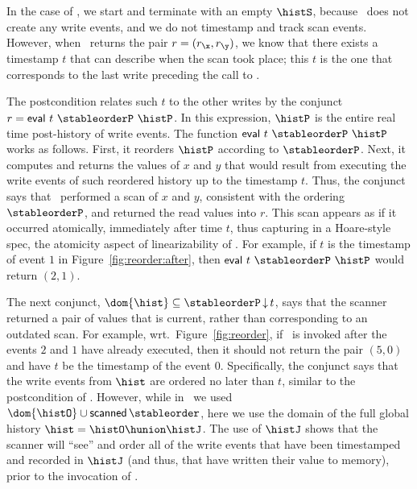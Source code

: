 
In the case of \jyscan, we start and terminate with an empty $\histS$,
because \jyscan\ does not create any write events, and we do not
timestamp and track scan events. However, when \jyscan\ returns the
pair $r = (r_\x, r_\y)$, we know that there exists a timestamp $t$
that can describe when the scan took place; this $t$ is the one that
corresponds to the last write preceding the call to \jyscan.

The postcondition relates such $t$ to the other writes by the conjunct
$r = \eval\ t\ \stableorderP\ \histP$. In this expression, $\histP$ is
the entire real time post-history of write events. The function
$\eval\ t\ \stableorderP\ \histP$ works as follows. First, it reorders
$\histP$ according to $\stableorderP$. Next, it computes and returns
the values of $x$ and $y$ that would result from executing the write
events of such reordered history up to the timestamp $t$. Thus, the
conjunct says that \jyscan\ performed a scan of $x$ and $y$,
consistent with the ordering $\stableorderP$, and returned the read
values into $r$. This scan appears as if it occurred atomically,
immediately after time $t$, thus capturing in a Hoare-style spec, the
atomicity aspect of linearizability of \jyscan.  For example, if $t$
is the timestamp of event $1$ in Figure~\ref{fig:reorder:after}, then
$\eval\ t\ \stableorderP\ \histP$ would return $(2, 1)$.

The next conjunct, $\dom{\hist} \subseteq \ideal{\stableorderP}{t}$,
says that the scanner returned a pair of values that is current,
rather than corresponding to an outdated scan. For example,
wrt.~Figure~\ref{fig:reorder}, if \jyscan\ is invoked after the events
$2$ and $1$ have already executed, then it should not return the pair
$(5, 0)$ and have $t$ be the timestamp of the event $0$. Specifically,
the conjunct says that the write events from $\hist$ are ordered no
later than $t$, similar to the postcondition of \jywrite. However,
while in \jywrite\ we used $\dom{\histO} \cup \scanned\stableorder$,
here we use the domain of the full global history $\hist = \histO
\hunion \histJ$. The use of $\histJ$ shows that the scanner will
``see'' and order all of the write events that have been timestamped
and recorded in $\histJ$ (and thus, that have written their value to
memory), prior to the invocation of \jyscan.

